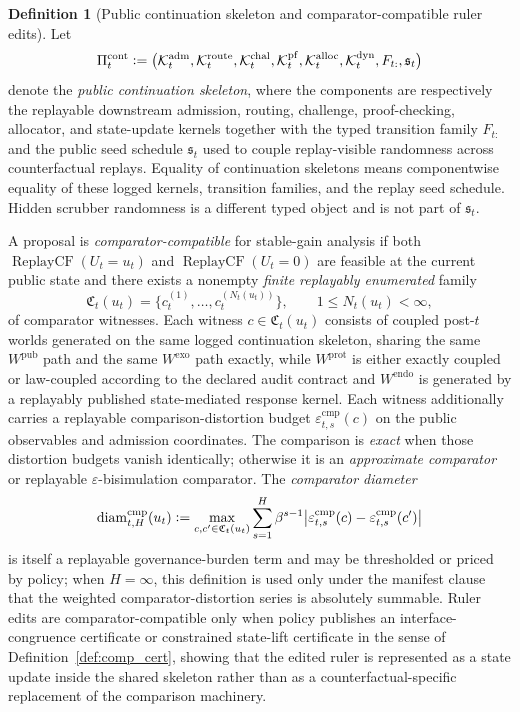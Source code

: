 \documentclass[11pt]{article}
\theoremstyle{definition}
\newtheorem{definition}[theorem]{Definition}
\newcommand{\1}{\mathbf{1}}
\newcommand{\Defeq}{\vcentcolon=}
\newcommand{\ReplayCF}{\operatorname{ReplayCF}}
\begin{document}
\begin{definition}[Public continuation skeleton and comparator-compatible ruler edits]\label{def:continuation_skeleton}
Let
\[
\Pi_t^{\mathrm{cont}}
\Defeq
\bigl(\mathcal K_t^{\mathrm{adm}},\mathcal K_t^{\mathrm{route}},\mathcal K_t^{\mathrm{chal}},\mathcal K_t^{\mathrm{pf}},\mathcal K_t^{\mathrm{alloc}},\mathcal K_t^{\mathrm{dyn}},F_{t:},\mathfrak s_t\bigr)
\]
denote the \emph{public continuation skeleton}, where the components are respectively the replayable downstream admission, routing, challenge, proof-checking, allocator, and state-update kernels together with the typed transition family $F_{t:}$ and the public seed schedule $\mathfrak s_t$ used to couple replay-visible randomness across counterfactual replays. Equality of continuation skeletons means componentwise equality of these logged kernels, transition families, and the replay seed schedule. Hidden scrubber randomness is a different typed object and is not part of $\mathfrak s_t$.

A proposal is \emph{comparator-compatible} for stable-gain analysis if both $\ReplayCF(U_t=u_t)$ and $\ReplayCF(U_t=0)$ are feasible at the current public state and there exists a nonempty \emph{finite replayably enumerated} family
\[
\mathfrak C_t(u_t)=\{c_t^{(1)},\dots,c_t^{(N_t(u_t))}\},\qquad 1\le N_t(u_t)<\infty,
\]
of comparator witnesses. Each witness $c\in\mathfrak C_t(u_t)$ consists of coupled post-$t$ worlds generated on the same logged continuation skeleton, sharing the same $W^{\mathrm{pub}}$ path and the same $W^{\mathrm{exo}}$ path exactly, while $W^{\mathrm{prot}}$ is either exactly coupled or law-coupled according to the declared audit contract and $W^{\mathrm{endo}}$ is generated by a replayably published state-mediated response kernel. Each witness additionally carries a replayable comparison-distortion budget $\varepsilon_{t,s}^{\mathrm{cmp}}(c)$ on the public observables and admission coordinates. The comparison is \emph{exact} when those distortion budgets vanish identically; otherwise it is an \emph{approximate comparator} or replayable $\varepsilon$-bisimulation comparator. The \emph{comparator diameter}
\[
\operatorname{diam}^{\mathrm{cmp}}_{t,H}(u_t)
\Defeq
\max_{c,c'\in\mathfrak C_t(u_t)}\sum_{s=1}^{H}\beta^{s-1}\bigl|\varepsilon_{t,s}^{\mathrm{cmp}}(c)-\varepsilon_{t,s}^{\mathrm{cmp}}(c')\bigr|
\]
is itself a replayable governance-burden term and may be thresholded or priced by policy; when $H=\infty$, this definition is used only under the manifest clause that the weighted comparator-distortion series is absolutely summable. Ruler edits are comparator-compatible only when policy publishes an interface-congruence certificate or constrained state-lift certificate in the sense of Definition~\ref{def:comp_cert}, showing that the edited ruler is represented as a state update inside the shared skeleton rather than as a counterfactual-specific replacement of the comparison machinery.
\end{definition}
\end{document}
